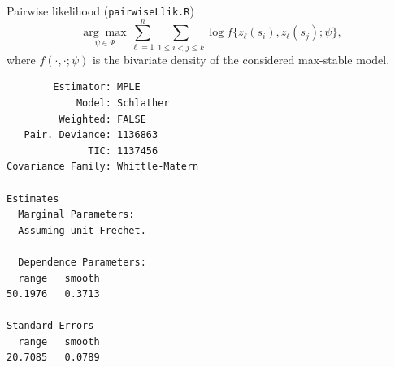 \documentclass[mode=present,style=simple,paper=screen]{powerdot}
\theoremstyle{plain}%
\theoremstyle{definition}
\theoremstyle{remark}
\begin{document}
\begin{wideslide}[toc=Pairwise likelihood,method=file]{Pairwise
    likelihood (\texttt{pairwiseLlik.R}) \citep{Padoan2010}}
  \vspace*{-2em}
  \begin{equation*}
    \underset{\psi \in \Psi}{\arg \max} \sum_{\ell = 1}^n \sum_{1 \leq
      i < j \leq k} \log f\{z_\ell(s_i), z_\ell(s_j); \psi\},
  \end{equation*}
  where $f(\cdot, \cdot; \psi)$ is the bivariate density of the
  considered max-stable model.

    \begin{minipage}[l]{.33\linewidth}
      {\tiny
\begin{verbatim}
        Estimator: MPLE
            Model: Schlather
         Weighted: FALSE
   Pair. Deviance: 1136863
              TIC: 1137456
Covariance Family: Whittle-Matern

Estimates
  Marginal Parameters:
  Assuming unit Frechet.

  Dependence Parameters:
  range   smooth
50.1976   0.3713

Standard Errors
  range   smooth
20.7085   0.0789


\end{verbatim}}
\end{minipage}
\end{wideslide}
\end{document}
